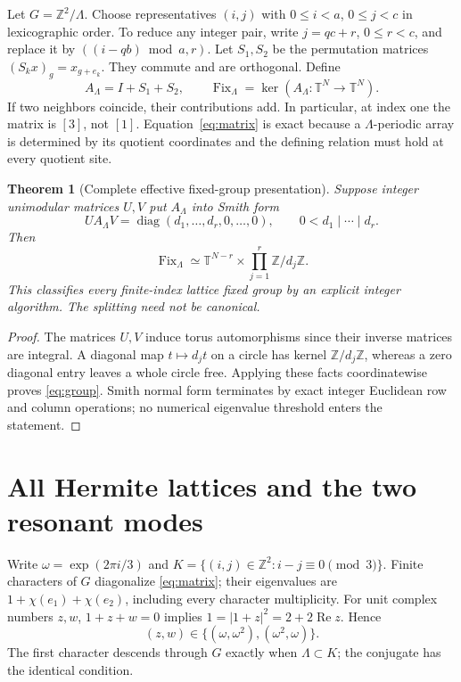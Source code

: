 \documentclass[10pt]{article}
\newcommand{\T}{\mathbb T}
\newcommand{\Z}{\mathbb Z}
\newcommand{\Fix}{\operatorname{Fix}}
\newtheorem{theorem}{Theorem}
\begin{document}
Let $G=\Z^2/\Lambda$. Choose representatives $(i,j)$ with
$0\le i<a$, $0\le j<c$ in lexicographic order. To reduce any integer pair,
write $j=qc+r$, $0\le r<c$, and replace it by
$((i-qb)\bmod a,r)$. Let $S_1,S_2$ be the permutation matrices
$(S_kx)_g=x_{g+e_k}$. They commute and are orthogonal. Define
\begin{equation}\label{eq:matrix}
 A_\Lambda=I+S_1+S_2,
 \qquad\Fix_\Lambda=\ker(A_\Lambda:\T^N\longrightarrow\T^N).
\end{equation}
If two neighbors coincide, their contributions add. In particular, at
index one the matrix is $[3]$, not $[1]$. Equation~\eqref{eq:matrix}
is exact because a $\Lambda$-periodic array is determined by its quotient
coordinates and the defining relation must hold at every quotient site.

\begin{theorem}[Complete effective fixed-group presentation]\label{thm:smith}
Suppose integer unimodular matrices $U,V$ put $A_\Lambda$ into Smith form
\[
 U A_\Lambda V=\operatorname{diag}(d_1,\ldots,d_r,0,\ldots,0),
 \qquad0<d_1\mid\cdots\mid d_r.
\]
Then
\begin{equation}\label{eq:group}
 \Fix_\Lambda\simeq\T^{N-r}\times
 \prod_{j=1}^r\Z/d_j\Z.
\end{equation}
This classifies every finite-index lattice fixed group by an explicit
integer algorithm. The splitting need not be canonical.
\end{theorem}
\begin{proof}
The matrices $U,V$ induce torus automorphisms since their inverse matrices
are integral. A diagonal map $t\mapsto d_jt$ on a circle has kernel
$\Z/d_j\Z$, whereas a zero diagonal entry leaves a whole circle free.
Applying these facts coordinatewise proves \eqref{eq:group}. Smith
normal form terminates by exact integer Euclidean row and column
operations; no numerical eigenvalue threshold enters the statement.
\end{proof}

\section{All Hermite lattices and the two resonant modes}
Write $\omega=\exp(2\pi i/3)$ and
$K=\{(i,j)\in\Z^2:i-j\equiv0\pmod3\}$.
Finite characters of $G$ diagonalize \eqref{eq:matrix}; their eigenvalues are
$1+\chi(e_1)+\chi(e_2)$, including every character multiplicity.
For unit complex numbers $z,w$, $1+z+w=0$ implies
$1=|1+z|^2=2+2\operatorname{Re}z$. Hence
\begin{equation}\label{eq:zeros}
 (z,w)\in\{(\omega,\omega^2),(\omega^2,\omega)\}.
\end{equation}
The first character descends through $G$ exactly when $\Lambda\subset K$;
the conjugate has the identical condition.
\end{document}

